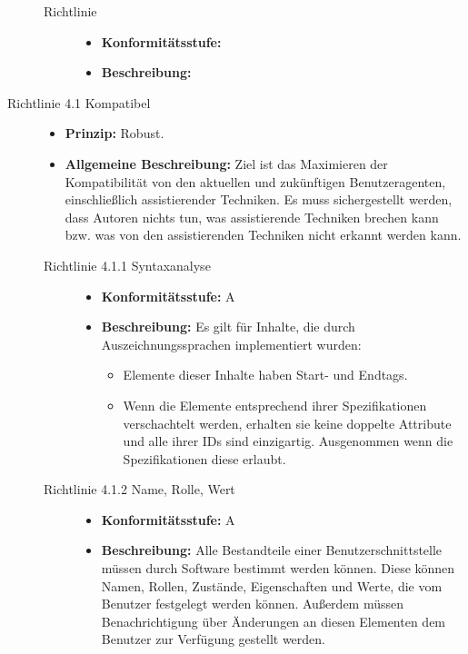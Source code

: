 \begin{description}
	\begin{description}
		\item[Richtlinie ]\hfill
		\begin{itemize}
			\item \textbf{Konformitätsstufe:}
			\item \textbf{Beschreibung:}
		\end{itemize}
	\end{description}

	\item[Richtlinie 4.1 Kompatibel]\hfill
	\begin{itemize}
		\item \textbf{Prinzip:} Robust.
		\item \textbf{Allgemeine Beschreibung:} Ziel ist das Maximieren der Kompatibilität von den aktuellen und zukünftigen Benutzeragenten, 
		einschließlich assistierender Techniken. Es muss sichergestellt werden, dass Autoren nichts tun, was assistierende Techniken brechen kann bzw. 
		was von den assistierenden Techniken nicht erkannt werden kann.
	\end{itemize}
	
	\begin{description}
		\item[Richtlinie 4.1.1 Syntaxanalyse]\hfill
		\begin{itemize}
			\item \textbf{Konformitätsstufe:} A
			\item \textbf{Beschreibung:} Es gilt für Inhalte, die durch Auszeichnungssprachen implementiert wurden:
			\begin{itemize}
				\item Elemente dieser Inhalte haben Start- und Endtags.
				\item Wenn die Elemente entsprechend ihrer Spezifikationen verschachtelt werden, erhalten sie keine doppelte Attribute und alle ihrer
				 IDs sind einzigartig. Ausgenommen wenn die Spezifikationen diese erlaubt.
				 
			\end{itemize}
		\end{itemize}
		
		\item[Richtlinie 4.1.2 Name, Rolle, Wert]\hfill
		\begin{itemize}
			\item \textbf{Konformitätsstufe:} A
			\item \textbf{Beschreibung:} Alle Bestandteile einer Benutzerschnittstelle müssen durch Software bestimmt werden können. Diese können 
			Namen, Rollen, Zustände, Eigenschaften und Werte, die vom Benutzer festgelegt werden können. Außerdem müssen Benachrichtigung über Änderungen 
			an diesen Elementen dem Benutzer zur Verfügung gestellt werden.
		\end{itemize}
	\end{description}

\end{description}

